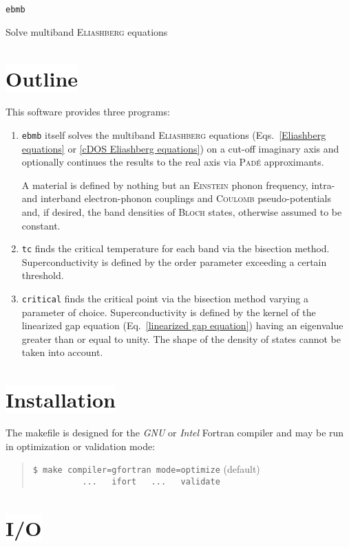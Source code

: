 \documentclass[a4paper]{article}
\newlength\gap
\def\headline#1{\section*{%
   \normalsize\normalfont%
   \rlap{\rule[0.5ex]\textwidth{0.4pt}}%
   \qquad\colorbox{white}{#1}%
   }}
\begin{document}
   \begin{center}
      \LARGE \texttt{ebmb} \par \bigskip
      \large Solve multiband \textsc{Eliashberg} equations
   \end{center}

   \headline{Outline}

   This software provides three programs:
   \begin{enumerate}
      \item
         \texttt{ebmb} itself solves the multiband \textsc{Eliashberg} equations
         (Eqs.~\ref{Eliashberg equations} or \ref{cDOS Eliashberg equations}) on
         a cut-off imaginary axis and optionally continues the results to the
         real axis via \textsc{Padé} approximants.

         A material is defined by nothing but an \textsc{Einstein} phonon
         frequency, intra- and interband electron-phonon couplings and
         \textsc{Coulomb} pseudo-potentials and, if desired, the band densities
         of \textsc{Bloch} states, otherwise assumed to be constant.

      \item
         \texttt{tc} finds the critical temperature for each band via the
         bisection method. Superconductivity is defined by the order parameter
         exceeding a certain threshold.

      \item
         \texttt{critical} finds the critical point via the bisection method
         varying a parameter of choice. Superconductivity is defined by the
         kernel of the linearized gap equation (Eq.~\ref{linearized gap
         equation}) having an eigenvalue greater than or equal to unity. The
         shape of the density of states cannot be taken into account.
   \end{enumerate}

   \headline{Installation}

   The makefile is designed for the \emph{GNU} or \emph{Intel} Fortran compiler
   and may be run in optimization or validation mode:
   \begin{quote}
      \verb|$ make compiler=gfortran mode=optimize| \quad (default) \\
      \verb|          ...   ifort   ...   validate|
   \end{quote}

   \headline{I/O}
\end{document}
